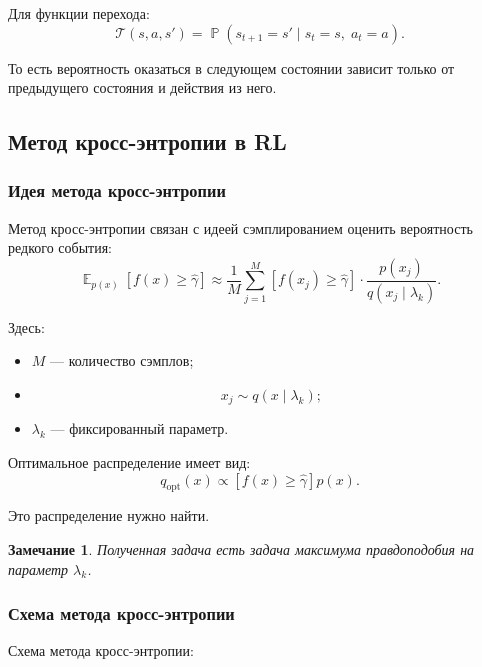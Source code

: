 \documentclass[12pt,a4paper]{article}
\newtheorem{remark}{Замечание}
\DeclareMathOperator{\E}{\mathbb E}
\DeclareMathOperator{\Pbb}{\mathbb P}
\begin{document}
Для функции перехода:
\[
\mathcal T(s,a,s')
=
\Pbb(s_{t+1}=s' \mid s_t=s,\; a_t=a).
\]

То есть вероятность оказаться в следующем состоянии зависит только от предыдущего состояния и действия из него.

\subsection{Метод кросс-энтропии в RL}

\subsubsection{Идея метода кросс-энтропии}

Метод кросс-энтропии связан с идеей сэмплированием оценить вероятность редкого события:
\[
\E_{p(x)}
\left[
f(x) \ge \hat\gamma
\right]
\approx
\frac{1}{M}
\sum_{j=1}^{M}
\left[
f(x_j) \ge \hat\gamma
\right]
\cdot
\frac{p(x_j)}
{q(x_j \mid \lambda_k)}.
\]

Здесь:
\begin{itemize}
    \item $M$ --- количество сэмплов;
    \item
    \[
    x_j \sim q(x \mid \lambda_k);
    \]
    \item $\lambda_k$ --- фиксированный параметр.
\end{itemize}

Оптимальное распределение имеет вид:
\[
q_{\mathrm{opt}}(x)
\propto
\left[
f(x) \ge \hat\gamma
\right]p(x).
\]

Это распределение нужно найти.

\begin{remark}
Полученная задача есть задача максимума правдоподобия на параметр $\lambda_k$.
\end{remark}

\subsubsection{Схема метода кросс-энтропии}

Схема метода кросс-энтропии:
\end{document}

